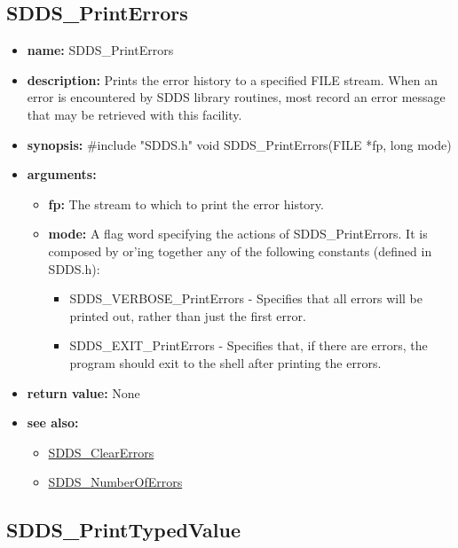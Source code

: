 \documentclass[11pt]{article}
\newcommand{\progref}[1]{\hyperref{SDDS_#1}{{\tt SDDS\_#1} (}{)}{SDDS_#1}}
\begin{document}
\subsection{SDDS\_PrintErrors}
\label{SDDS_PrintErrors}

\begin{itemize}
\item {\bf name:}\newline
SDDS\_PrintErrors
\item {\bf description:}\newline
Prints the error history to a specified FILE stream. When an error is encountered by SDDS library routines, most record an error message that may be retrieved with this facility.
\item {\bf synopsis:} \#include "SDDS.h"\newline
void SDDS\_PrintErrors(FILE *fp, long mode)
\item {\bf arguments:}
\begin{itemize}
\item {\bf fp:} The stream to which to print the error history.
\item {\bf mode:} A flag word specifying the actions of SDDS\_PrintErrors. It is composed by or'ing together any of the following constants (defined in SDDS.h):
\begin{itemize}
\item SDDS\_VERBOSE\_PrintErrors - Specifies that all errors will be printed out, rather than just the first error.
\item SDDS\_EXIT\_PrintErrors - Specifies that, if there are errors, the program should exit to the shell after printing the errors.
\end{itemize}
\end{itemize}
\item {\bf return value:}\newline
None
\item {\bf see also:}
\begin{itemize}
\item \progref{ClearErrors}
\item \progref{NumberOfErrors}
\end{itemize}
\end{itemize}

\subsection{SDDS\_PrintTypedValue}
\label{SDDS_PrintTypedValue}
\end{document}
